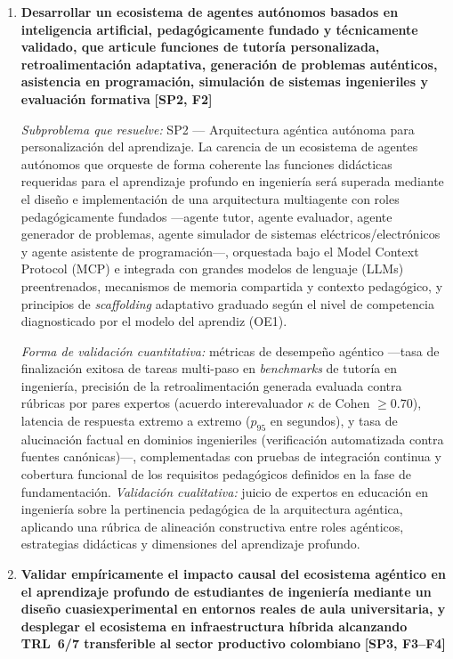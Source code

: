 \begin{enumerate}[leftmargin=*, itemsep=12pt]
    \item \textbf{Desarrollar un ecosistema de agentes autónomos basados en inteligencia
    artificial, pedagógicamente fundado y técnicamente validado, que articule funciones de tutoría
    personalizada, retroalimentación adaptativa, generación de problemas auténticos, asistencia en
    programación, simulación de sistemas ingenieriles y evaluación formativa}
    \hfill \textbf{[SP2, F2]}

    \textit{Subproblema que resuelve:} SP2 — Arquitectura agéntica autónoma para personalización
    del aprendizaje. La carencia de un ecosistema de agentes autónomos que orqueste de forma
    coherente las funciones didácticas requeridas para el aprendizaje profundo en ingeniería será
    superada mediante el diseño e implementación de una arquitectura multiagente con roles
    pedagógicamente fundados —agente tutor, agente evaluador, agente generador de problemas,
    agente simulador de sistemas eléctricos/electrónicos y agente asistente de programación—,
    orquestada bajo el Model Context Protocol (MCP) e integrada con grandes modelos de lenguaje
    (LLMs) preentrenados, mecanismos de memoria compartida y contexto pedagógico, y principios de
    \emph{scaffolding} adaptativo graduado según el nivel de competencia diagnosticado por el
    modelo del aprendiz (OE1).

    \textit{Forma de validación cuantitativa:} métricas de desempeño agéntico —tasa de
    finalización exitosa de tareas multi-paso en \emph{benchmarks} de tutoría en ingeniería,
    precisión de la retroalimentación generada evaluada contra rúbricas por pares expertos
    (acuerdo interevaluador $\kappa$ de Cohen $\geq 0.70$), latencia de respuesta extremo a
    extremo ($p_{95}$ en segundos), y tasa de alucinación factual en dominios ingenieriles
    (verificación automatizada contra fuentes canónicas)—, complementadas con pruebas de
    integración continua y cobertura funcional de los requisitos pedagógicos definidos en la fase
    de fundamentación. \textit{Validación cualitativa:} juicio de expertos en educación en
    ingeniería sobre la pertinencia pedagógica de la arquitectura agéntica, aplicando una rúbrica
    de alineación constructiva entre roles agénticos, estrategias didácticas y dimensiones del
    aprendizaje profundo.

    \item \textbf{Validar empíricamente el impacto causal del ecosistema agéntico en el
    aprendizaje profundo de estudiantes de ingeniería mediante un diseño cuasiexperimental en
    entornos reales de aula universitaria, y desplegar el ecosistema en infraestructura híbrida
    alcanzando TRL~6/7 transferible al sector productivo colombiano}
    \hfill \textbf{[SP3, F3--F4]}


\end{enumerate}
